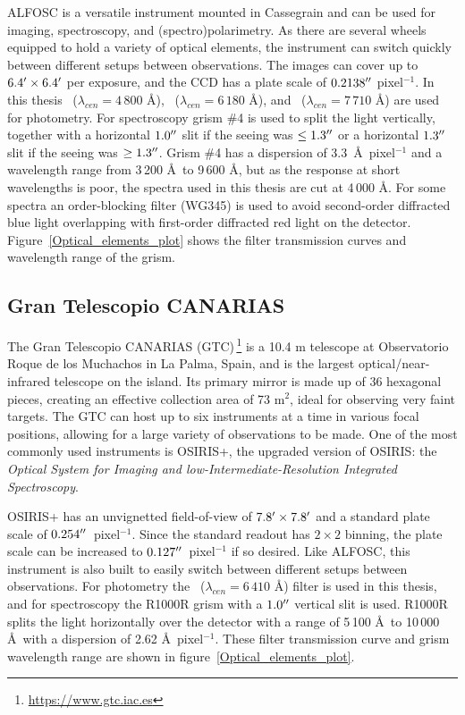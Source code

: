 \documentclass[a4paper,oneside,12pt, class=Latex/Classes/PhDthesisPSnPDF, crop=false]{standalone}
\begin{document}
ALFOSC is a versatile instrument mounted in Cassegrain and can be used for imaging, spectroscopy, and (spectro)polarimetry. As there are several wheels equipped to hold a variety of optical elements, the instrument can switch quickly between different setups between observations. The images can cover up to $6.4^{\prime}\times6.4^{\prime}$ per exposure, and the CCD has a plate scale of $0.2138^{\prime\prime}$ pixel$^{-1}$. In this thesis \ztfg~($\lambda_{cen} = 4\,800$ \AA), \ztfr~($\lambda_{cen} = 6\,180$ \AA), and \ztfi~($\lambda_{cen} = 7\,710$ \AA) are used for photometry. For spectroscopy grism \#4 is used to split the light vertically, together with a horizontal $1.0^{\prime\prime}$ slit if the seeing was $\leq1.3^{\prime\prime}$ or a horizontal $1.3^{\prime\prime}$ slit if the seeing was $\geq1.3^{\prime\prime}$. Grism \#4 has a dispersion of 3.3~\AA~pixel$^{-1}$ and a wavelength range from 3\,200 \AA\ to 9\,600 \AA, but as the response at short wavelengths is poor, the spectra used in this thesis are cut at 4\,000 \AA. For some spectra an order-blocking filter (WG345) is used to avoid second-order diffracted blue light overlapping with first-order diffracted red light on the detector. Figure~\ref{Optical_elements_plot} shows the filter transmission curves and wavelength range of the grism.


\subsection{Gran Telescopio CANARIAS}
\label{GTC}
The Gran Telescopio CANARIAS (GTC)\,\footnote{\url{https://www.gtc.iac.es}} is a 10.4 m telescope at Observatorio Roque de los Muchachos in La Palma, Spain, and is the largest optical/near-infrared telescope on the island. Its primary mirror is made up of 36 hexagonal pieces, creating an effective collection area of 73 m$^2$, ideal for observing very faint targets. The GTC can host up to six instruments at a time in various focal positions, allowing for a large variety of observations to be made. One of the most commonly used instruments is OSIRIS+, the upgraded version of OSIRIS: the \textit{Optical System for Imaging and low-Intermediate-Resolution Integrated Spectroscopy}.

OSIRIS+ has an unvignetted field-of-view of $7.8^{\prime}\times7.8^{\prime}$ and a standard plate scale of $0.254^{\prime\prime}$~pixel$^{-1}$. Since the standard readout has $2\times2$ binning, the plate scale can be increased to $0.127^{\prime\prime}$~pixel$^{-1}$ if so desired. Like ALFOSC, this instrument is also built to easily switch between different setups between observations. For photometry the \ztfr~($\lambda_{cen} =6\,410$ \AA) filter is used in this thesis, and for spectroscopy the R1000R grism with a $1.0^{\prime\prime}$ vertical slit is used. R1000R splits the light horizontally over the detector with a range of 5\,100 \AA\ to 10\,000 \AA\ with a dispersion of 2.62 \AA\ pixel$^{-1}$. These filter transmission curve and grism wavelength range are shown in figure~\ref{Optical_elements_plot}.
\end{document}
